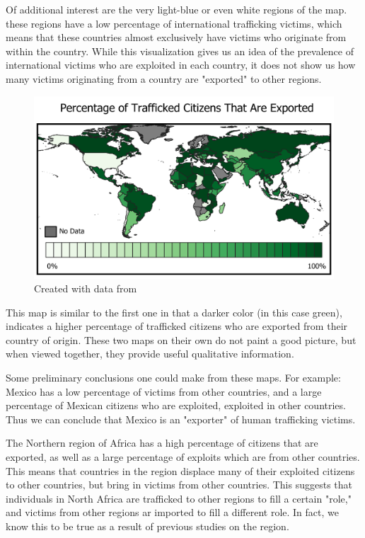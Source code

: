 \documentclass{article} %
\begin{document}
Of additional interest are the very light-blue or even white regions of the map. these regions have a low percentage of international trafficking victims, which means that these countries almost exclusively have victims who originate from within the country. While this visualization gives us an idea of the prevalence of international victims who are exploited in each country, it does not show us how many victims originating from a country are "exported" to other regions.

\FloatBarrier

\begin{center}
	\begin{figure}[H]
		\includegraphics[width = 5.6in]{ProposalMap2}
		\scriptsize{\caption{Created with data from \cite{CTDC}}}
	\end{figure}
\end{center}
\FloatBarrier

This map is similar to the first one in that a darker color (in this case green), indicates a higher percentage of trafficked citizens who are exported from their country of origin. These two maps on their own do not paint a good picture, but when viewed together, they provide useful qualitative information.

Some preliminary conclusions one could make from these maps. For example: Mexico has a low percentage of victims from other countries, and a large percentage of Mexican citizens who are exploited, exploited in other countries. Thus we can conclude that Mexico is an "exporter" of human trafficking victims.
	
The Northern region of Africa has a high percentage of citizens that are exported, as well as a large percentage of exploits which are from other countries. This means that countries in the region displace many of their exploited citizens to other countries, but bring in victims from other countries. This suggests that individuals in North Africa are trafficked to other regions to fill a certain "role," and victims from other regions ar imported to fill a different role. In fact, we know this to be true as a result of previous studies on the region.
\end{document}
